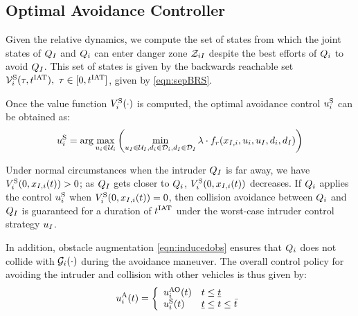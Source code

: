 \subsection{Optimal Avoidance Controller} \label{sec:intruder_avoid}
Given the relative dynamics, we compute the set of states from which the joint states of $Q_{I}$ and $Q_i$ can enter danger zone $\mathcal{Z}_{iI}$ despite the best efforts of $Q_i$ to avoid $Q_{I}$. This set of states is given by the backwards reachable set $\mathcal{V}^{\text{S}}_{i}(\tau, t^\text{IAT}),~ \tau \in [0, t^\text{IAT}]$, given by \eqref{eqn:sepBRS}.

Once the value function $V^{\text{S}}_{i}(\cdot)$ is computed, the optimal avoidance control ${u^{\text{S}}_{i}}$ can be obtained as:
\begin{equation} \label{eqn:optAvoidCtrl}
{\ctrl^{\text{S}}_{i}} = \arg \max_{\ctrl_i \in \cset_i} \left( \min_{\ctrl_\intr \in \cset_\intr, \dstb_i \in \dset_i, \dstb_\intr \in \dset_\intr} \costate \cdot f_r(\state_{\intr, i}, \ctrl_i, \ctrl_\intr, \dstb_i, \dstb_\intr) \right)
\end{equation}

Under normal circumstances when the intruder $Q_{I}$ is far away, we have $V^{\text{S}}_{i}(0, x_{I, i}(t)) > 0$; as $Q_{I}$ gets closer to $Q_i$, $V^{\text{S}}_{i}(0, x_{I, i}(t))$ decreases. If $Q_i$ applies the control ${u^{\text{S}}_{i}}$ when $V^{\text{S}}_{i}(0, x_{I, i}(t)) = 0$, then collision avoidance between $Q_i$ and $Q_{I}$ is guaranteed for a duration of $t^\text{IAT}$ under the worst-case intruder control strategy $u_I$.

In addition, obstacle augmentation \eqref{eqn:inducedobs} ensures that $Q_i$ does not collide with $\mathcal{G}_i(\cdot)$ during the avoidance maneuver. %
The overall control policy for avoiding the intruder and collision with other vehicles is thus given by:
\begin{equation*}
{u^{\text{A}}_{i}}(t) = 
\left \{ 
\begin{array}{ll}
{u^{\text{AO}}_{i}}(t) & t \leq \underline{t}\\
{u^{\text{S}}_{i}}(t) & \underline{t}\leq t \leq \bar{t}
\end{array}
\right.
\end{equation*}
